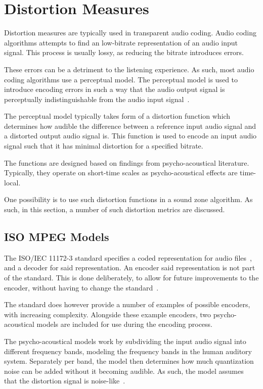 \section{Distortion Measures}
Distortion measures are typically used in transparent audio coding.
Audio coding algorithms attempts to find an low-bitrate representation of an audio input signal.
This process is usually lossy, as reducing the bitrate introduces errors.

These errors can be a detriment to the listening experience.
As such, most audio coding algorithms use a perceptual model.
The perceptual model is used to introduce encoding errors in such a way that the audio output
signal is perceptually indistinguishable from the audio input signal~\cite{taal2012low}.

The perceptual model typically takes form of a distortion function which determines how
audible the difference between a reference input audio signal and a distorted output audio signal is.
This function is used to encode an input audio signal such that it has minimal distortion for a
specified bitrate.

The functions are designed based on findings from psycho-acoustical literature.
Typically, they operate on short-time scales as psycho-acoustical effects are time-local.

One possibility is to use such distortion functions in a sound zone algorithm.
As such, in this section, a number of such distortion metrics are discussed.

\subsection{ISO MPEG Models}
The ISO/IEC 11172-3 standard specifies a coded representation for audio files~\cite{ISO11172-3}, 
and a decoder for said representation.
An encoder said representation is not part of the standard.
This is done deliberately, to allow for future improvements to the encoder, without having to change the standard~\cite{pan1995tutorial}.

The standard does however provide a number of examples of possible encoders, with increasing complexity.
Alongside these example encoders, two psycho-acoustical models are included for use during the encoding process. 

The psycho-acoustical models work by subdividing the input audio signal into different frequency bands, 
modeling the frequency bands in the human auditory system.
Separately per band, the model then determines how much quantization noise can be added without it becoming audible.
As such, the model assumes that the distortion signal is noise-like~\cite{van2005perceptual}.

